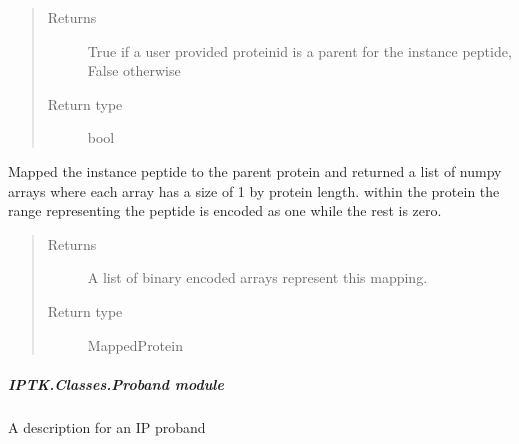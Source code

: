 \documentclass[letterpaper,10pt,english]{sphinxmanual}
\begin{document}
\begin{fulllineitems}
\begin{fulllineitems}
\begin{quote}
\begin{description}
\item[{Returns}] \leavevmode
True if a user provided protein\sphinxhyphen{}id is a parent for the instance peptide, False otherwise

\item[{Return type}] \leavevmode
bool

\end{description}\end{quote}

\end{fulllineitems}


\begin{fulllineitems}
\label{\detokenize{IPTK.Classes:IPTK.Classes.Peptide.Peptide.map_to_parent_protein}}
Mapped the instance peptide to the parent protein and returned a 
list of numpy arrays where each array has a size of 1 by protein length. 
within the protein the range representing the peptide is encoded as one while
the rest is zero.
\begin{quote}\begin{description}
\item[{Returns}] \leavevmode
A list of binary encoded arrays represent this mapping.

\item[{Return type}] \leavevmode
MappedProtein

\end{description}\end{quote}

\end{fulllineitems}


\end{fulllineitems}



\subparagraph{IPTK.Classes.Proband module}
\label{\detokenize{IPTK.Classes:module-IPTK.Classes.Proband}}\label{\detokenize{IPTK.Classes:iptk-classes-proband-module}}
A description for an IP proband
\end{document}
